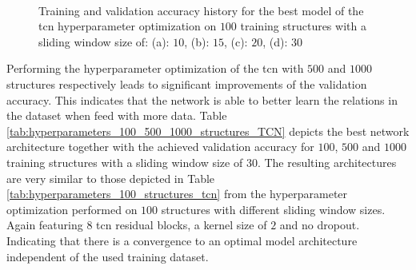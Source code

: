 \documentclass[conference]{IEEEtran}
\begin{document}
\begin{figure}[htp]
	\centering
	\quad
	\\
	\quad
	\caption{Training and validation accuracy history for the best model of the \gls{tcn} hyperparameter optimization on $ 100 $ training structures with a sliding window size of: (a): $ 10 $, (b): $ 15 $, (c): $ 20 $, (d): $ 30 $}
	\label{fig:accuracy_100_structures_random_search_tcn}
\end{figure}

Performing the hyperparameter optimization of the \gls{tcn} with $ 500 $ and $ 1000 $ structures respectively leads to significant improvements of the validation accuracy. This indicates that the network is able to better learn the relations in the dataset when feed with more data. Table \ref{tab:hyperparameters_100_500_1000_structures_TCN} depicts the best network architecture together with the achieved validation accuracy for $ 100 $, $ 500 $ and $ 1000 $ training structures with a sliding window size of $ 30 $. The resulting architectures are very similar to those depicted in Table \ref{tab:hyperparameters_100_structures_tcn} from the hyperparameter optimization performed on $ 100 $ structures with different sliding window sizes. Again featuring $ 8 $ \gls{tcn} residual blocks, a kernel size of $ 2 $ and no dropout. Indicating that there is a convergence to an optimal model architecture independent of the used training dataset.
\end{document}
